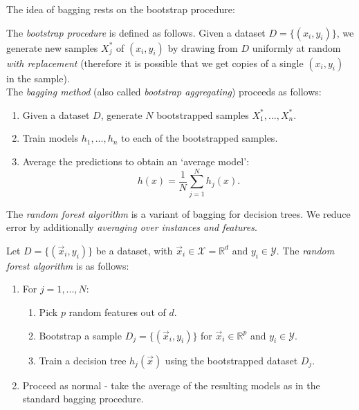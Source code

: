 The idea of bagging rests on the bootstrap procedure:

\begin{framedef}
The \textit{bootstrap procedure} is defined as follows. Given a dataset $D = \{(x_i,y_i)\}$, we generate new samples $X_j^*$ of $(x_i,y_i)$ by drawing from $D$ uniformly at random \textit{with replacement} (therefore it is possible that we get copies of a single $(x_i,y_i)$ in the sample).\\

The \textit{bagging method} (also called \textit{bootstrap aggregating}) proceeds as follows:
\begin{enumerate}[label = (\arabic*)]
\item Given a dataset $D$, generate $N$ bootstrapped samples $X_1^*, ..., X_n^*$.
\item Train models $h_1,..., h_n$ to each of the bootstrapped samples.
\item Average the predictions to obtain an `average model':
\begin{equation*}
h(x) = \frac{1}{N} \sum_{j=1}^{N} h_j(x).
\end{equation*}
\end{enumerate}
\end{framedef}

The \textit{random forest algorithm} is a variant of bagging for decision trees. We reduce error by additionally \textit{averaging over instances and features}. 

\begin{framedef}
Let $D = \{(\vec{x}_i, y_i)\}$ be a dataset, with $\vec{x}_i \in \mathcal{X} = \mathbb{R}^d$ and $y_i \in \mathcal{Y}$. The \textit{random forest algorithm} is as follows:
\begin{enumerate}[label = (\arabic*)]
\item For $j=1,...,N$:
\begin{enumerate}[label = (\roman*)]
\item Pick $p$ random features out of $d$.
\item Bootstrap a sample $D_j = \{(\vec{x}_i, y_i)\}$ for $\vec{x}_i \in \mathbb{R}^p$ and $y_i \in \mathcal{Y}$.
\item Train a decision tree $h_j(\vec{x})$ using the bootstrapped dataset $D_j$. 
\end{enumerate}
\item Proceed as normal - take the average of the resulting models as in the standard bagging procedure.
\end{enumerate}
\end{framedef}




